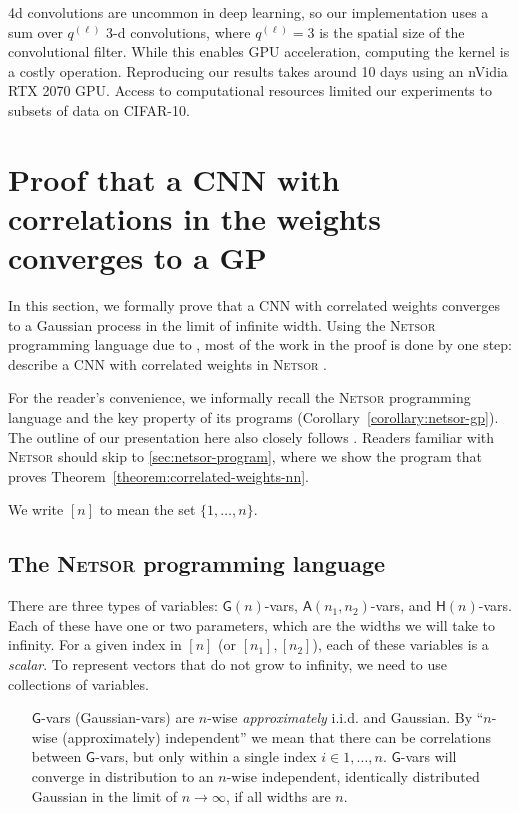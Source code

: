\documentclass[tablecaption=bottom,wcp,nonatbib]{jmlr} %
\begin{document}
4d convolutions are uncommon in deep learning, so our implementation uses a sum over $q^{(\ell)}$ 3-d convolutions, where $q^{(\ell)}=3$ is the spatial size of the convolutional filter. While this enables GPU acceleration, computing the kernel is a costly operation. Reproducing our results takes around 10 days using an nVidia RTX 2070 GPU. Access to computational resources limited our experiments to subsets of data on CIFAR-10.


\section{Proof that a CNN with correlations in the weights converges to a GP\label{app:netsor}}
{  %
  \newcommand{\Gva}{\mathsf{G}}
  \newcommand{\Hva}{\mathsf{H}}
  \newcommand{\Ava}{\mathsf{A}}
  \newcommand{\MatMul}{{\texttt{MatMul} }}
  \newcommand{\LinComb}{{\texttt{LinComb} }}
  \newcommand{\Nonlin}{{\texttt{Nonlin} }}
  \newcommand{\Netsor}{{\textsc{Netsor} }}


In this section, we formally prove that a CNN with correlated weights converges
to a Gaussian process in the limit of infinite width. Using the \Netsor
programming language due to \citet{yang2019wide}, most of the work in the proof
is done by
one step: describe a CNN with correlated weights in \Netsor.

For the reader's convenience, we informally recall the \Netsor programming language
\citep{yang2019wide} and the key property of its programs (Corollary~\ref{corollary:netsor-gp}). The outline of our presentation here also closely follows
\citet{yang2019wide}. Readers familiar with \Netsor should skip to
\cref{sec:netsor-program}, where we show the program that proves Theorem~\ref{theorem:correlated-weights-nn}.


We write $[n]$ to mean the set $\{1,\dots,n\}$.

\subsection{The \Netsor programming language}
There are three types of variables: $\Gva(n)$-vars, $\Ava(n_1,
n_2)$-vars, and $\Hva(n)$-vars. Each of these have one or two
parameters, which are the widths we will take to infinity. For a
given index in $[n]$ (or $[n_1],[n_2]$), each of these variables is a \emph{scalar}. To
represent vectors that do not grow to infinity, we need to use collections of variables.

\begin{itemize}
\item[$\Gva$-vars] (Gaussian-vars) are $n$-wise \emph{approximately}
i.i.d. and Gaussian. By ``$n$-wise (approximately) independent'' we mean that there can be
correlations between $\Gva$-vars, but only within a single index $i \in 1,\dots,n$.
$\Gva$-vars will converge in
distribution to an $n$-wise independent, identically distributed Gaussian in the limit of $n \to \infty$, if
all widths are $n$.


\end{itemize}}
\end{document}
